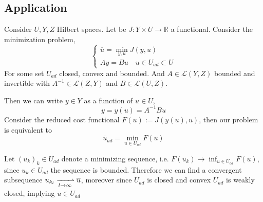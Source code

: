 \subsection{Application}
Consider $U, Y, Z$ Hilbert spaces. Let be  $J: Y\times U \rightarrow \mathbb{R}$ a functional. Consider the minimization problem,
\begin{equation*}
	\left\lbrace
	\begin{array}{l}
	\overline{u}=\underset{y,u}{\min} J(y,u) \\
	Ay=Bu \quad u \in U_{ad} \subset U
	\end{array}
	\right.
\end{equation*}
For some set $U_{ad}$ closed, convex and bounded. And $A \in \mathcal{L}(Y,Z)$ bounded and invertible with $A^{-1}\in \mathcal{L}(Z, Y)$ and $B\in \mathcal{L}(U, Z)$.

Then we can write $y \in Y$ as a function of $u \in U$,
\[
y=y(u)=A^{-1}Bu
\]
Consider the reduced cost functional  $	F(u):=J(y(u), u)$, then our problem is equivalent to
\[
	\overline{u}_{ad}=\min_{u \in U_{ad}} F(u) 
\]


Let $(u_k)_k \in U_{ad}$ denote a minimizing sequence, i.e. $F(u_k) \rightarrow \inf_{u\in U_{ad}}F(u)$, since $u_k \in U_{ad}$ the sequence is bounded. Therefore we can find a convergent subsequence $u_{k_{l}} \xrightharpoonup[l\rightarrow \infty]{} \overline{u}$, moreover since $U_{ad}$ is closed and convex $U_{ad}$ is weakly closed, implying $\overline{u} \in U_{ad}$

